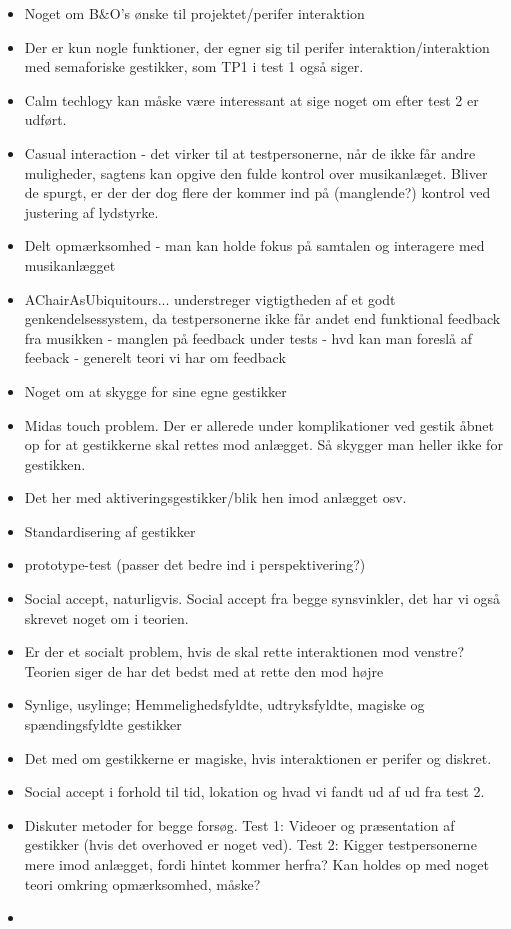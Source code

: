 \begin{itemize}
	\item Noget om B$\&$O's ønske til projektet/perifer interaktion
	\item Der er kun nogle funktioner, der egner sig til perifer interaktion/interaktion med semaforiske gestikker, som TP1 i test 1 også siger. 
	\item Calm techlogy kan måske være interessant at sige noget om efter test 2 er udført.
	\item Casual interaction - det virker til at testpersonerne, når de ikke får andre muligheder, sagtens kan opgive den fulde kontrol over musikanlæget. Bliver de spurgt, er der der dog flere der kommer ind på (manglende?) kontrol ved justering af lydstyrke.
	\item Delt opmærksomhed - man kan holde fokus på samtalen og interagere med musikanlægget
	\item AChairAsUbiquitours... understreger vigtigtheden af et godt genkendelsessystem, da testpersonerne ikke får andet end funktional feedback fra musikken - manglen på feedback under tests - hvd kan man foreslå af feeback - generelt teori vi har om feedback
	\item Noget om at skygge for sine egne gestikker
	\item Midas touch problem. Der er allerede under komplikationer ved gestik åbnet op for at gestikkerne skal rettes mod anlægget. Så skygger man heller ikke for gestikken.
	\item Det her med aktiveringsgestikker/blik hen imod anlægget osv. 
	\item Standardisering af gestikker
	\item prototype-test (passer det bedre ind i perspektivering?)
	\item Social accept, naturligvis. Social accept fra begge synsvinkler, det har vi også skrevet noget om i teorien. 
	\item Er der et socialt problem, hvis de skal rette interaktionen mod venstre? Teorien siger de har det bedst med at rette den mod højre
	\item Synlige, usylinge; Hemmelighedsfyldte, udtryksfyldte, 
	magiske og spændingsfyldte gestikker
	\item Det med om gestikkerne er magiske, hvis interaktionen er perifer og diskret. 
	\item Social accept i forhold til tid, lokation og hvad vi fandt ud af ud fra test 2. 
	\item Diskuter metoder for begge forsøg. Test 1: Videoer og præsentation af gestikker (hvis det overhoved er noget ved). Test 2: Kigger testpersonerne mere imod anlægget, fordi hintet kommer herfra? Kan holdes op med noget teori omkring opmærksomhed, måske?
	\item 
\end{itemize}


